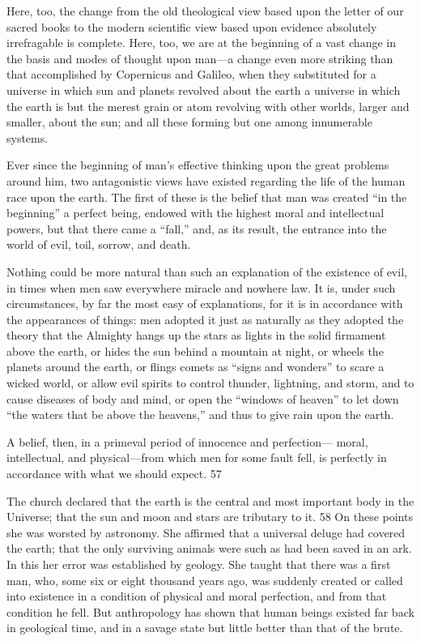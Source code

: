 Here, too, the change from the old theological view based upon the letter of our sacred books
to the modern scientific view based upon evidence absolutely irrefragable is complete. Here,
too, we are at the beginning of a vast change in the basis and modes of thought upon man—a
change even more striking than that accomplished by Copernicus and Galileo, when they
substituted for a universe in which sun and planets revolved about the earth a universe in
which the earth is but the merest grain or atom revolving with other worlds, larger and
smaller, about the sun; and all these forming but one among innumerable systems.

Ever since the beginning of man's effective thinking upon the great problems around him,
two antagonistic views have existed regarding the life of the human race upon the earth. The
first of these is the belief that man was created ``in the beginning'' a perfect being, endowed
with the highest moral and intellectual powers, but that there came a ``fall,'' and, as its result,
the entrance into the world of evil, toil, sorrow, and death.

Nothing could be more natural than such an explanation of the existence of evil, in times
when men saw everywhere miracle and nowhere law. It is, under such circumstances, by far
the most easy of explanations, for it is in accordance with the appearances of things: men
adopted it just as naturally as they adopted the theory that the Almighty hangs up the stars as
lights in the solid firmament above the earth, or hides the sun behind a mountain at night, or
wheels the planets around the earth, or flings comets as ``signs and wonders'' to scare a
wicked world, or allow evil spirits to control thunder, lightning, and storm, and to cause
diseases of body and mind, or open the ``windows of heaven'' to let down ``the waters that be
above the heavens,'' and thus to give rain upon the earth.

A belief, then, in a primeval period of innocence and perfection— moral, intellectual, and
physical—from which men for some fault fell, is perfectly in accordance with what we
should expect. 57

The church declared that the earth is the central and most important body in the Universe;
that the sun and moon and stars are tributary to it. 58 On these points she was worsted by
astronomy. She affirmed that a universal deluge had covered the earth; that the only
surviving animals were such as had been saved in an ark. In this her error was established by
geology. She taught that there was a first man, who, some six or eight thousand years ago,
was suddenly created or called into existence in a condition of physical and moral perfection,
and from that condition he fell. But anthropology has shown that human beings existed far
back in geological time, and in a savage state but little better than that of the brute.

